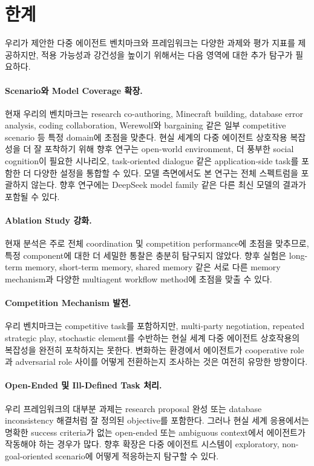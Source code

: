 \section{한계}
우리가 제안한 다중 에이전트 벤치마크와 프레임워크는 다양한 과제와 평가 지표를 제공하지만, 적용 가능성과 강건성을 높이기 위해서는 다음 영역에 대한 추가 탐구가 필요하다.

\paragraph{Scenario와 Model Coverage 확장.}
현재 우리의 벤치마크는 research co-authoring, Minecraft building, database error analysis, coding collaboration, Werewolf와 bargaining 같은 일부 competitive scenario 등 특정 domain에 초점을 맞춘다. 현실 세계의 다중 에이전트 상호작용 복잡성을 더 잘 포착하기 위해 향후 연구는 open-world environment, 더 풍부한 social cognition이 필요한 시나리오, task-oriented dialogue 같은 application-side task를 포함한 더 다양한 설정을 통합할 수 있다. 모델 측면에서도 본 연구는 전체 스펙트럼을 포괄하지 않는다. 향후 연구에는 DeepSeek model family 같은 다른 최신 모델의 결과가 포함될 수 있다.

\paragraph{Ablation Study 강화.}
현재 분석은 주로 전체 coordination 및 competition performance에 초점을 맞추므로, 특정 component에 대한 더 세밀한 통찰은 충분히 탐구되지 않았다. 향후 실험은 long-term memory, short-term memory, shared memory 같은 서로 다른 memory mechanism과 다양한 multiagent workflow method에 초점을 맞출 수 있다.

\paragraph{Competition Mechanism 발전.}
우리 벤치마크는 competitive task를 포함하지만, multi-party negotiation, repeated strategic play, stochastic element를 수반하는 현실 세계 다중 에이전트 상호작용의 복잡성을 완전히 포착하지는 못한다. 변화하는 환경에서 에이전트가 cooperative role과 adversarial role 사이를 어떻게 전환하는지 조사하는 것은 여전히 유망한 방향이다.

\paragraph{Open-Ended 및 Ill-Defined Task 처리.}
우리 프레임워크의 대부분 과제는 research proposal 완성 또는 database inconsistency 해결처럼 잘 정의된 objective를 포함한다. 그러나 현실 세계 응용에서는 명확한 success criteria가 없는 open-ended 또는 ambiguous context에서 에이전트가 작동해야 하는 경우가 많다. 향후 확장은 다중 에이전트 시스템이 exploratory, non-goal-oriented scenario에 어떻게 적응하는지 탐구할 수 있다.
